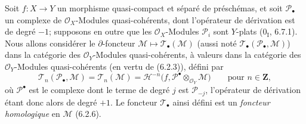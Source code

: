 \begin{env}[7.7.1]
Soit $f:X\to Y$ un morphisme quasi-compact et séparé de préschémas, et soit
$\mathscr P_\bullet$ un complexe de $\mathscr O_X$-Modules quasi-cohérents, dont
l'opérateur de dérivation est de degré $-1$; supposons en outre que les
$\mathscr O_X$-Modules $\mathscr P_i$ sont $Y$-plats ($0_{\mathrm I}$, 6.7.1).
Nous allons considérer le $\partial$-foncteur
$\mathscr M\mapsto\mathscr T_\bullet(\mathscr M)$ (aussi noté
$\mathscr T_\bullet(\mathscr P_\bullet,\mathscr M)$) dans la catégorie des
$\mathscr O_Y$-Modules quasi-cohérents, à valeurs dans la catégorie des
$\mathscr O_Y$-Modules quasi-cohérents (en vertu de (6.2.3)), défini par
\[
  \mathscr T_n(\mathscr P_\bullet,\mathscr M)
  =\mathscr T_n(\mathscr M)
  =\mathscr H^{-n}
    \bigl(f,\mathscr P^\bullet\otimes_{\mathscr O_Y}\mathscr M\bigr)
  \qquad\text{pour }n\in\mathbf Z,
  \tag{7.7.1.1}\label{III.7.7.1.1.fr}
\]
où $\mathscr P^\bullet$ est le complexe dont le terme de degré $j$ est
$\mathscr P_{-j}$, l'opérateur de dérivation étant donc alors de degré $+1$. Le foncteur
$\mathscr T_\bullet$ ainsi défini est un \emph{foncteur homologique} en
$\mathscr M$ (6.2.6).
\end{env}

